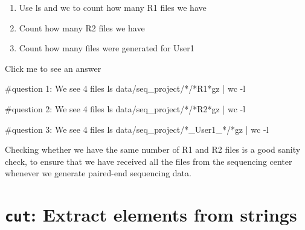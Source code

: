 \documentclass[
  letterpaper,
  DIV=11,
  numbers=noendperiod]{scrreprt}
\newenvironment{Shaded}{}{}
\newcommand{\AttributeTok}[1]{\textcolor[rgb]{0.84,0.23,0.29}{#1}}
\newcommand{\CommentTok}[1]{\textcolor[rgb]{0.42,0.45,0.49}{#1}}
\newcommand{\FunctionTok}[1]{\textcolor[rgb]{0.44,0.26,0.76}{#1}}
\newcommand{\KeywordTok}[1]{\textcolor[rgb]{0.84,0.23,0.29}{#1}}
\newcommand{\NormalTok}[1]{\textcolor[rgb]{0.14,0.16,0.18}{#1}}
\newcommand{\PreprocessorTok}[1]{\textcolor[rgb]{0.84,0.23,0.29}{#1}}
\providecommand{\tightlist}{%
  \setlength{\itemsep}{0pt}\setlength{\parskip}{0pt}}\usepackage{longtable,booktabs,array}
\begin{document}
\begin{tcolorbox}[enhanced jigsaw, breakable, left=2mm, title=\textcolor{quarto-callout-caution-color}{\faFire}\hspace{0.5em}{Exercise}, opacityback=0, opacitybacktitle=0.6, rightrule=.15mm, bottomrule=.15mm, colback=white, colframe=quarto-callout-caution-color-frame, coltitle=black, bottomtitle=1mm, arc=.35mm, toprule=.15mm, colbacktitle=quarto-callout-caution-color!10!white, toptitle=1mm, titlerule=0mm, leftrule=.75mm]

\begin{enumerate}
\def\labelenumi{\arabic{enumi}.}
\tightlist
\item
  Use ls and wc to count how many R1 files we have
\item
  Count how many R2 files we have
\item
  Count how many files were generated for User1
\end{enumerate}

Click me to see an answer

\begin{Shaded}
\begin{Highlighting}[]
\CommentTok{\#question 1: We see 4 files}
\FunctionTok{ls}\NormalTok{ data/seq\_project/}\PreprocessorTok{*}\NormalTok{/}\PreprocessorTok{*}\NormalTok{R1}\PreprocessorTok{*}\NormalTok{gz }\KeywordTok{|} \FunctionTok{wc} \AttributeTok{{-}l} 

\CommentTok{\#question 2: We see 4 files}
\FunctionTok{ls}\NormalTok{ data/seq\_project/}\PreprocessorTok{*}\NormalTok{/}\PreprocessorTok{*}\NormalTok{R2}\PreprocessorTok{*}\NormalTok{gz }\KeywordTok{|} \FunctionTok{wc} \AttributeTok{{-}l} 

\CommentTok{\#question 3: We see 4 files}
\FunctionTok{ls}\NormalTok{ data/seq\_project/}\PreprocessorTok{*}\NormalTok{\_User1\_}\PreprocessorTok{*}\NormalTok{/}\PreprocessorTok{*}\NormalTok{gz }\KeywordTok{|} \FunctionTok{wc} \AttributeTok{{-}l} 
\end{Highlighting}
\end{Shaded}

Checking whether we have the same number of R1 and R2 files is a good
sanity check, to ensure that we have received all the files from the
sequencing center whenever we generate paired-end sequencing data.

\end{tcolorbox}

\section{\texorpdfstring{\texttt{cut}: Extract elements from
strings}{cut: Extract elements from strings}}\label{cut-extract-elements-from-strings}
\end{document}
